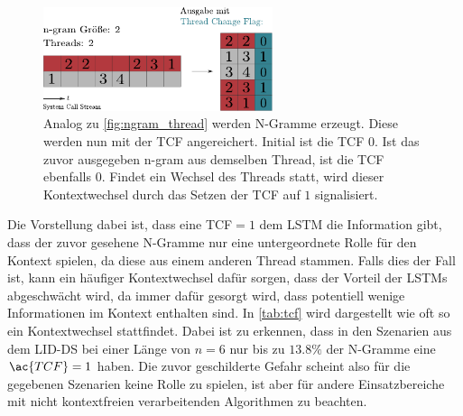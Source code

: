                 \begin{figure}[ht]
                    \centering
                    \includegraphics[width=0.6\textwidth]{images/tcf.pdf}
                    \caption[Erstellung Thread Aware N-Gramme]{Analog zu \autoref{fig:ngram_thread} werden N-Gramme erzeugt.
                             Diese werden nun mit der \ac{TCF} angereichert.
                             Initial ist die \ac{TCF} $0$.
                             Ist das zuvor ausgegeben n-gram aus demselben Thread, ist die \ac{TCF} ebenfalls $0$.
                             Findet ein Wechsel des Threads statt, wird dieser Kontextwechsel durch das Setzen der \ac{TCF} auf $1$ signalisiert.}\label{fig:ngram_tcf}
                \end{figure}

                Die Vorstellung dabei ist, dass eine \ac{TCF}$= 1$ dem \ac{LSTM} die Information gibt, dass der zuvor gesehene N-Gramme nur eine untergeordnete Rolle für den Kontext spielen, da diese aus einem anderen Thread stammen.
                Falls dies der Fall ist, kann ein häufiger Kontextwechsel dafür sorgen, dass der Vorteil der \ac{LSTM}s abgeschwächt wird, da immer dafür gesorgt wird, dass potentiell wenige Informationen im Kontext enthalten sind.
                In \autoref{tab:tcf} wird dargestellt wie oft so ein Kontextwechsel stattfindet.
                Dabei ist zu erkennen, dass in den Szenarien aus dem \ac{LID-DS} bei einer Länge von $n=6$ nur bis zu $13.8\%$ der N-Gramme eine $\ac{TCF}=1$ haben.
                Die zuvor geschilderte Gefahr scheint also für die gegebenen Szenarien keine Rolle zu spielen, ist aber für andere Einsatzbereiche mit nicht kontextfreien verarbeitenden Algorithmen zu beachten.


